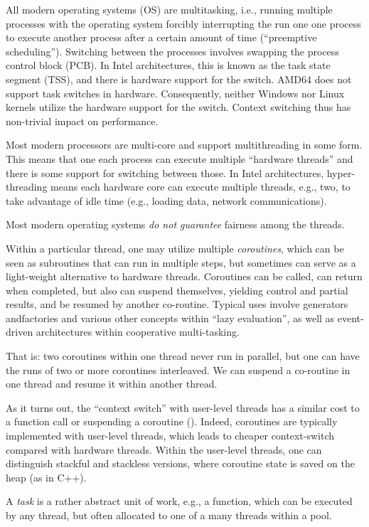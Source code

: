 All modern operating systems (OS) are multitasking, i.e., running multiple processes with the operating system forcibly interrupting the run one one process to execute another process after a certain amount of time (``preemptive scheduling''). Switching between the processes involves swapping the process control block (PCB). In Intel architectures, this is known as the task state segment (TSS), and there is hardware support for the switch. AMD64 does not support task switches in hardware.
Consequently, neither Windows nor Linux kernels utilize the hardware support for the switch.
Context switching thus has non-trivial impact on performance. 

Most modern processors are multi-core and support multithreading in some form. This means that one 
each process can execute multiple ``hardware threads'' and there is some support for switching between those. In Intel architectures, hyper-threading means each hardware core can execute multiple threads, e.g., two, to take advantage of idle time (e.g., loading data, network communications).  

Most modern operating systems \emph{do not guarantee} fairness among the threads. 

Within a particular thread, one may utilize multiple \emph{coroutines}, which can be seen as subroutines that can run in multiple steps, but sometimes can serve as a light-weight alternative to hardware threads. Coroutines can be called, can return when completed, but also can suspend themselves, yielding control and partial results, and be resumed by another co-routine. Typical uses involve generators andfactories and various other concepts within ``lazy evaluation'', as well as event-driven architectures within cooperative multi-tasking. 

That is: two coroutines within one thread never run in parallel, but one can have the runs of two or more coroutines interleaved. We can suspend a co-routine in one thread and resume it within another thread. 

As it turns out, the ``context switch'' with user-level threads has a similar cost to a function call or suspending a coroutine (). Indeed, coroutines are typically implemented with user-level threads, which leads to cheaper context-switch compared with hardware threads. Within the user-level threads, one can distinguish stackful and stackless versions, where coroutine state is saved on the heap (as in C++). 

A \emph{task} is a rather abstract unit of work, e.g., a function, which can be executed by any thread, but often allocated to one of a many threads within a pool. 


